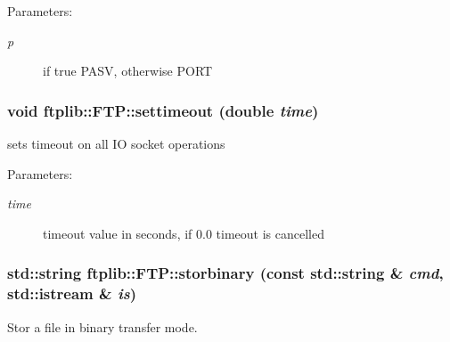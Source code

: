 \begin{Desc}
\item[Parameters:]
\begin{description}
\item[{\em p}]if true PASV, otherwise PORT \end{description}
\end{Desc}
\hypertarget{classftplib_1_1FTP_a6603cda3b7c44c48c6a2b8d688d3bb7}{
\subsubsection[{settimeout}]{\setlength{\rightskip}{0pt plus 5cm}void ftplib::FTP::settimeout (double {\em time})}}
\label{classftplib_1_1FTP_a6603cda3b7c44c48c6a2b8d688d3bb7}


sets timeout on all IO socket operations 

\begin{Desc}
\item[Parameters:]
\begin{description}
\item[{\em time}]timeout value in seconds, if 0.0 timeout is cancelled \end{description}
\end{Desc}
\hypertarget{classftplib_1_1FTP_37c828c7d98c7da3fe3b936526118416}{
\subsubsection[{storbinary}]{\setlength{\rightskip}{0pt plus 5cm}std::string ftplib::FTP::storbinary (const std::string \& {\em cmd}, \/  std::istream \& {\em is})}}
\label{classftplib_1_1FTP_37c828c7d98c7da3fe3b936526118416}


Stor a file in binary transfer mode. 

